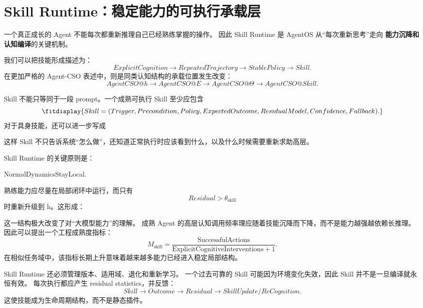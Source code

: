 \section{Skill Runtime：稳定能力的可执行承载层}

一个真正成长的 Agent 不能每次都重新推理自己已经熟练掌握的操作。
因此 Skill Runtime 是 AgentOS 从``每次重新思考''走向
\textbf{能力沉降和认知编译}的关键机制。

我们可以把技能形成描述为：
\[
ExplicitCognition
\rightarrow
RepeatedTrajectory
\rightarrow
StablePolicy
\rightarrow
Skill.
\]
在更加严格的 Agent-CSO 表述中，则是同类认知结构的承载位置发生改变：
\[
AgentCSO@h
\rightarrow
AgentCSO@E
\rightarrow
AgentCSO@\Theta
\rightarrow
AgentCSO@Skill.
\]

Skill 不能只等同于一段 prompt。一个成熟可执行 Skill 至少应包含
\[
\fitdisplay{
Skill=
(
Trigger,
Precondition,
Policy,
ExpectedOutcome,
ResidualModel,
Confidence,
Fallback
).
}
\]
对于具身技能，还可以进一步写成
\begin{statementbox}
\centering
{}
\end{statementbox}
这样 Skill 不只告诉系统``怎么做''，还知道正常执行时应该看到什么，以及什么时候需要重新求助高层。

Skill Runtime 的关键原则是：
\begin{statementbox}
NormalDynamicsStayLocal.
\end{statementbox}
熟练能力应尽量在局部闭环中运行，而只有
\[
Residual>\theta_{\mathrm{skill}}
\]
时重新升级到 h。这形成：
\begin{statementbox}
\centering
{}
\end{statementbox}

这一结构极大改变了对``大模型能力''的理解。
成熟 Agent 的高层认知调用频率理应随着技能沉降而下降，而不是能力越强越依赖长推理。
因此可以提出一个工程成熟度指标：
\[
M_{\mathrm{skill}}
=
\frac{\mathrm{SuccessfulActions}}
{\mathrm{ExplicitCognitiveInterventions}+1}.
\]
在相似任务域中，该指标长期上升意味着越来越多能力已经进入稳定局部结构。

Skill Runtime 还必须管理版本、适用域、退化和重新学习。
一个过去可靠的 Skill 可能因为环境变化失效，因此 Skill 并不是一旦编译就永恒有效。
每次执行都应产生 residual statistics，并反馈：
\[
Skill
\rightarrow
Outcome
\rightarrow
Residual
\rightarrow
SkillUpdate/ReCognition.
\]
这使技能成为生命周期结构，而不是静态插件。


